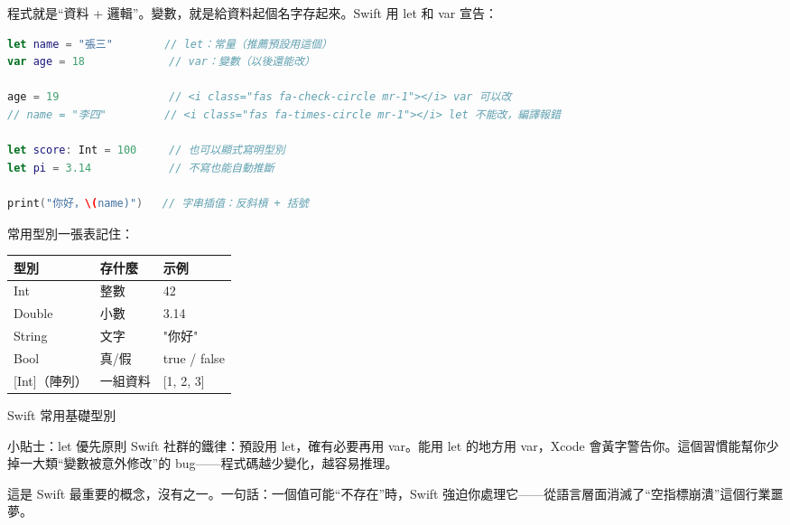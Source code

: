 


程式就是“資料 + 邏輯”。變數，就是給資料起個名字存起來。Swift 用 let 和 var 宣告：

\begin{lstlisting}[language=Swift]
let name = "張三"        // let：常量（推薦預設用這個）
var age = 18             // var：變數（以後還能改）

age = 19                 // <i class="fas fa-check-circle mr-1"></i> var 可以改
// name = "李四"         // <i class="fas fa-times-circle mr-1"></i> let 不能改，編譯報錯

let score: Int = 100     // 也可以顯式寫明型別
let pi = 3.14            // 不寫也能自動推斷

print("你好，\(name)")   // 字串插值：反斜槓 + 括號
\end{lstlisting}

常用型別一張表記住：

\begin{center}
\begin{tabularx}{\linewidth}{|X|X|X|}
\hline
\textbf{型別} & \textbf{存什麼} & \textbf{示例} \tabularnewline
\hline
Int & 整數 & 42 \tabularnewline
Double & 小數 & 3.14 \tabularnewline
String & 文字 & "你好" \tabularnewline
Bool & 真/假 & true / false \tabularnewline
{}[Int]（陣列） & 一組資料 & {}[1, 2, 3] \tabularnewline
\hline
\end{tabularx}
\end{center}

\begin{center}\small\color{gray}Swift 常用基礎型別\end{center}

\begin{tcbinfo}{小貼士：let 優先原則}
Swift 社群的鐵律：預設用 let，確有必要再用 var。能用 let 的地方用 var，Xcode 會黃字警告你。這個習慣能幫你少掉一大類“變數被意外修改”的 bug——程式碼越少變化，越容易推理。

\end{tcbinfo}


這是 Swift 最重要的概念，沒有之一。一句話：一個值可能“不存在”時，Swift 強迫你處理它——從語言層面消滅了“空指標崩潰”這個行業噩夢。


